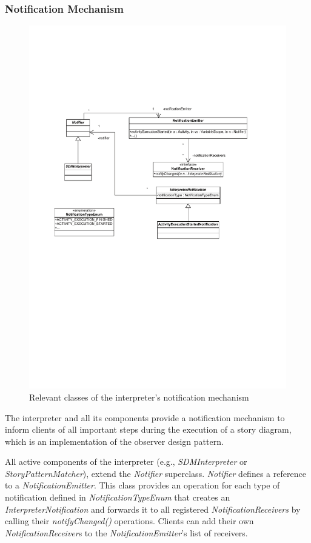 \subsubsection{Notification Mechanism}
\label{sec:notification_mechanism}

\begin{figure}
\includegraphics[width=1.0\columnwidth]{figures/interpreter_metamodel_facades.pdf} 
\caption{Relevant classes of the interpreter's notification mechanism}
\end{figure}

The interpreter and all its components provide a notification mechanism to inform clients of all important steps during the execution of a story diagram, which is an implementation of the observer design pattern.

All active components of the interpreter (e.g., \emph{SDMInterpreter} or \emph{StoryPatternMatcher}), extend the \emph{Notifier} superclass.
\emph{Notifier} defines a reference to a \emph{NotificationEmitter}. 
This class provides an operation for each type of notification defined in \emph{NotificationTypeEnum} that creates an \emph{InterpreterNotification} and forwards it to all registered \emph{NotificationReceivers} by calling their \emph{notifyChanged()} operations. 
Clients can add their own \emph{NotificationReceiver}s to the \emph{NotificationEmitter}'s list of receivers.

